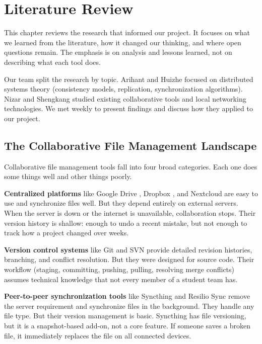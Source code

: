 \chapter{Literature Review}

This chapter reviews the research that informed our project. It focuses on what we learned from the literature, how it changed our thinking, and where open questions remain. The emphasis is on analysis and lessons learned, not on describing what each tool does.

Our team split the research by topic. Arihant and Huizhe focused on distributed systems theory (consistency models, replication, synchronization algorithms). Nizar and Shengkang studied existing collaborative tools and local networking technologies. We met weekly to present findings and discuss how they applied to our project.

\section{The Collaborative File Management Landscape}

Collaborative file management tools fall into four broad categories. Each one does some things well and other things poorly.

\textbf{Centralized platforms} like Google Drive \cite{googledrive}, Dropbox \cite{dropbox}, and Nextcloud are easy to use and synchronize files well. But they depend entirely on external servers. When the server is down or the internet is unavailable, collaboration stops. Their version history is shallow: enough to undo a recent mistake, but not enough to track how a project changed over weeks.

\textbf{Version control systems} like Git \cite{gitbook} and SVN provide detailed revision histories, branching, and conflict resolution. But they were designed for source code. Their workflow (staging, committing, pushing, pulling, resolving merge conflicts) assumes technical knowledge that not every member of a student team has.

\textbf{Peer-to-peer synchronization tools} like Syncthing \cite{syncthing} and Resilio Sync \cite{resilio} remove the server requirement and synchronize files in the background. They handle any file type. But their version management is basic. Syncthing has file versioning, but it is a snapshot-based add-on, not a core feature. If someone saves a broken file, it immediately replaces the file on all connected devices.

